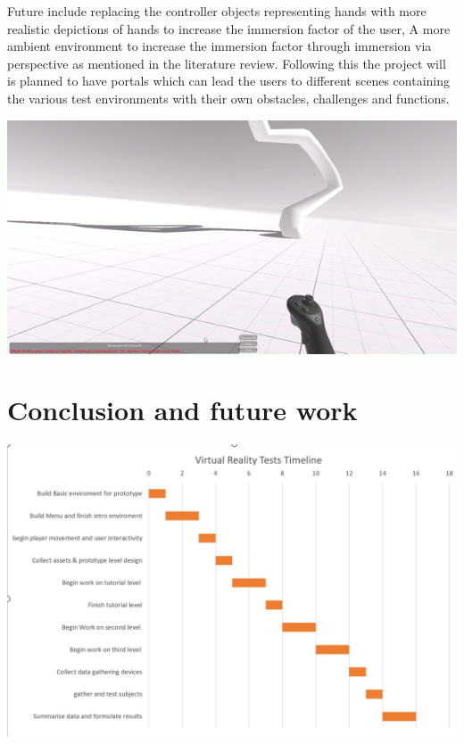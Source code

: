 Future include replacing the controller objects representing hands with more realistic depictions of hands to increase the immersion factor of the user, A more ambient environment to increase the immersion factor through immersion via perspective as mentioned in the literature review. Following this the project will is planned to have portals which can lead the users to different scenes containing the various test environments with their own obstacles, challenges and functions. 

 \includegraphics[width=15cm]{Chapters/Picture3.png}


\chapter{Conclusion and future work}

\includegraphics[width=15cm]{Chapters/Picture4.png}
